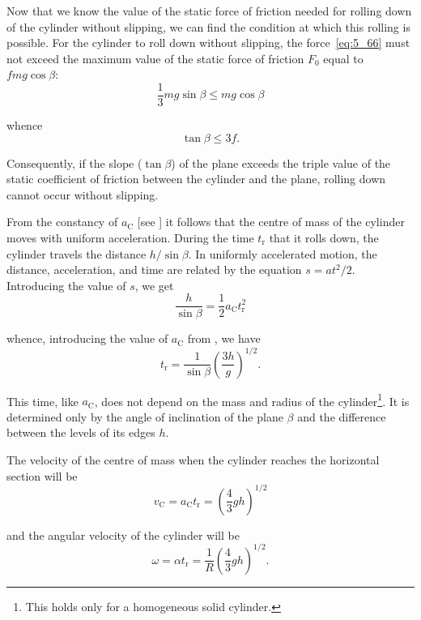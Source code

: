 Now that we know the value of the static force of friction needed for rolling down of the cylinder without slipping, we can find the condition at which this rolling is possible. For the cylinder to roll down without slipping, the force~\eqref{eq:5_66} must not exceed the maximum value of the static force of friction $F_0$ equal to $fmg\cos\beta$:
\begin{equation*}
	\frac{1}{3} mg\sin\beta \leqslant mg\cos\beta
\end{equation*}

\noindent
whence
\begin{equation*}
	\tan\beta \leqslant 3f.
\end{equation*}

\noindent
Consequently, if the slope ($\tan\beta$) of the plane exceeds the triple value of the static coefficient of friction between the cylinder and the plane, rolling down cannot occur without slipping.

From the constancy of $a_{\text{C}}$ [see ] it follows that the centre of mass of the cylinder moves with uniform acceleration. During the time $t_{\text{r}}$ that it rolls down, the cylinder travels the distance $h/\sin\beta$. In uniformly accelerated motion, the distance, acceleration, and time are related by the equation $s=at^2/2$. Introducing the value of $s$, we get
\begin{equation*}
	\frac{h}{\sin\beta} = \frac{1}{2}a_{\text{C}}t_{\text{r}}^2
\end{equation*}

\noindent
whence, introducing the value of $a_{\text{C}}$ from , we have
\begin{equation*}
	t_{\text{r}} = \frac{1}{\sin\beta}\left(\frac{3h}{g}\right)^{1/2}.
\end{equation*}

\noindent
This time, like $a_{\text{C}}$, does not depend on the mass and radius of the cylinder\footnote{This holds only for a homogeneous solid cylinder.}. It is determined only by the angle of inclination of the plane $\beta$ and the difference between the levels of its edges $h$.

The velocity of the centre of mass when the cylinder reaches the horizontal section will be
\begin{equation*}
	v_{\text{C}} = a_{\text{C}}t_{\text{r}} = \left(\frac{4}{3}gh\right)^{1/2}
\end{equation*}

\noindent
and the angular velocity of the cylinder will be
\begin{equation*}
	\omega = \alpha t_{\text{r}} = \frac{1}{R} \left(\frac{4}{3}gh\right)^{1/2}.
\end{equation*}

